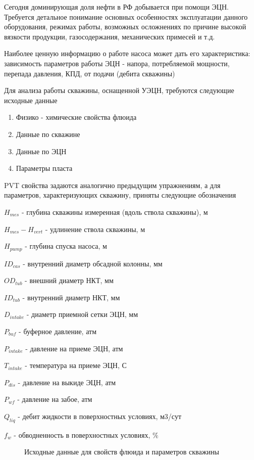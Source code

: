 Сегодня доминирующая доля нефти в РФ добывается при помощи ЭЦН. Требуется детальное понимание основных особенностях эксплуатации данного оборудования, режимах работы, возможных осложнениях по причине высокой вязкости продукции, газосодержания, механических примесей и т.д.

Наиболее ценную информацию о работе насоса может дать его характеристика: зависимость параметров работы ЭЦН - напора, потребляемой мощности, перепада давления, КПД, от подачи (дебита скважины)

Для анализа работы скважины, оснащенной УЭЦН, требуются следующие исходные данные

\begin{enumerate}
	\item Физико - химические свойства флюида
	\item Данные по скважине
	\item Данные по ЭЦН
	\item Параметры пласта
\end{enumerate}

PVT свойства задаются аналогично предыдущим упражнениям, а для параметров, характеризующих скважину, приняты следующие обозначения

$H_{mes}$ - глубина скважины измеренная (вдоль ствола скважины), м

$H_{mes}- H_{vert}$ - удлинение ствола скважины, м

$H_{pump}$ - глубина спуска насоса, м

$ID_{cas}$ - внутренний диаметр обсадной колонны, мм

$OD_{tub}$ - внешний диаметр НКТ, мм

$ID_{tub}$ - внутренний диаметр НКТ, мм

$D_{intake}$ - диаметр приемной сетки ЭЦН, мм

$P_{buf}$ - буферное давление, атм

$P_{intake}$ - давление на приеме ЭЦН, атм

$T_{intake}$ - температура на приеме ЭЦН, С

$P_{dis}$ - давление на выкиде ЭЦН, атм

$P_{wf}$ - давление на забое, атм

$Q_{liq}$ - дебит жидкости в поверхностных условиях, м3/сут

$f_w$ - обводненность в поверхностных условиях, \%

\begin{figure}[h!]
	\center{\texttt{[image: Ex70\_1]}}
	\caption{Исходные данные для свойств флюида и параметров скважины}
	\label{ris:Ex70_1}
\end{figure}

